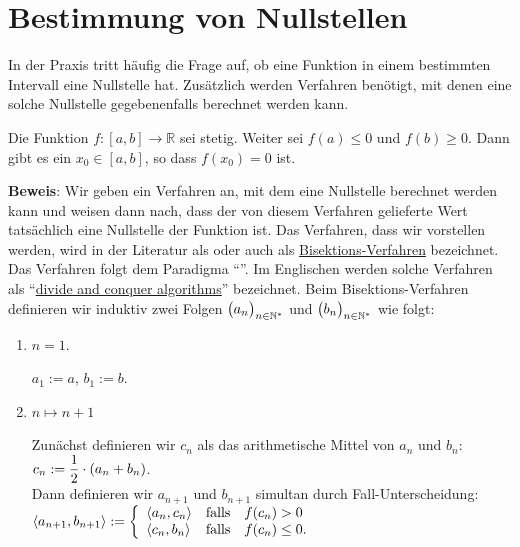 \section{Bestimmung von Nullstellen}
In der Praxis tritt h\"aufig die Frage auf, ob eine Funktion in einem bestimmten Intervall
eine Nullstelle hat.  Zus\"atzlich werden Verfahren ben\"otigt, mit denen eine solche
Nullstelle gegebenenfalls berechnet werden kann.

\begin{Satz} \label{satz:zws-stetig} \lb
Die Funktion $f:[a,b] \rightarrow \mathbb{R}$ sei stetig.  Weiter sei $f(a) \leq 0$ und
$f(b) \geq 0$.  Dann gibt es ein $x_0 \in [a,b]$, so dass $f(x_0) = 0$ ist.
\end{Satz}

\noindent
\textbf{Beweis}: Wir geben ein Verfahren an, mit dem eine Nullstelle berechnet werden kann
und weisen dann nach, dass der von diesem Verfahren gelieferte Wert tats\"achlich eine
Nullstelle der Funktion ist.  Das Verfahren, dass wir vorstellen werden, wird in der
Literatur als  oder auch als
\href{http://en.wikipedia.org/wiki/Bisection_method}{Bisektions-Verfahren} bezeichnet.  
Das Verfahren folgt dem Paradigma ``''.  Im Englischen werden solche
Verfahren als
``\href{http://en.wikipedia.org/wiki/Divide_and_conquer_algorithms}{divide and conquer algorithms}''
bezeichnet.
Beim Bisektions-Verfahren definieren wir induktiv zwei Folgen $\bigl(a_n\bigr)_{n\in\mathbb{N}^*}$ und
$\bigl(b_n\bigr)_{n\in\mathbb{N}^*}$ wie folgt:
\begin{enumerate}
\item[I.A.:] $n=1$.

      $a_1 := a$,  \quad $b_1 := b$.
\item[I.S.:] $n \mapsto n+1$

      Zun\"achst definieren wir $c_n$ als das arithmetische Mittel von $a_n$ und $b_n$:
      \\[0.2cm]
      \hspace*{1.3cm} $\displaystyle c_n := \frac{1}{2} \cdot (a_n + b_n)$. \\[0.2cm]
      Dann definieren wir $a_{n+1}$ und $b_{n+1}$ simultan durch Fall-Unterscheidung:
      \\[0.2cm]
      \hspace*{1.3cm}
      $\pair(a_{n+1}, b_{n+1}) := \left\{ \begin{array}{ll}
                          \pair(a_n,c_n) & \mbox{falls}\quad f(c_n) >    0 \\
                          \pair(c_n,b_n)   & \mbox{falls}\quad f(c_n) \leq 0. \\
                          \end{array}
                  \right.
      $
\end{enumerate}
